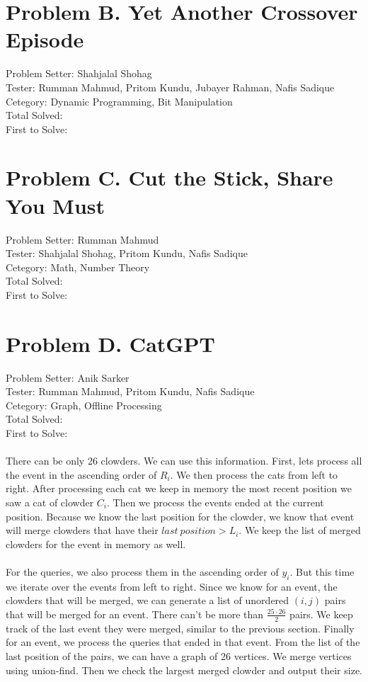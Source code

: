 \documentclass[11pt,a4paper]{article}
\begin{document}
\section*{Problem B. Yet Another Crossover Episode}
Problem Setter: Shahjalal Shohag \\
Tester: Rumman Mahmud, Pritom Kundu, Jubayer Rahman, Nafis Sadique \\
Cetegory: Dynamic Programming, Bit Manipulation \\
Total Solved:  \\
First to Solve: \\

\section*{Problem C. Cut the Stick, Share You Must}
Problem Setter: Rumman Mahmud \\
Tester: Shahjalal Shohag, Pritom Kundu, Nafis Sadique \\
Cetegory: Math, Number Theory \\
Total Solved:  \\
First to Solve: \\

\section*{Problem D. CatGPT}
Problem Setter: Anik Sarker \\
Tester: Rumman Mahmud, Pritom Kundu, Nafis Sadique \\
Cetegory: Graph, Offline Processing \\
Total Solved:  \\
First to Solve: \\
\\
There can be only 26 clowders. We can use this information. First, lets process
all the event in the ascending order of $R_i$. We then process the cats from left
to right. After processing each cat we keep in memory the most recent position we 
saw a cat of clowder $C_i$. Then we process the events ended at the current position.
Because we know the last position for the clowder, we know that event will merge
clowders that have their $last\ position > L_i$. We keep the list of merged clowders
for the event in memory as well.\\
\\
For the queries, we also process them in the ascending order of $y_i$. But this time we 
iterate over the events from left to right. Since we know for an event, the clowders that
will be merged, we can generate a list of unordered $(i,j)$ pairs that will be merged for
an event. There can't be more than $\frac{25 \cdot 26}{2}$ pairs. We keep track of the last event
they were merged, similar to the previous section. Finally for an event, we process the 
queries that ended in that event. From the list of the last position of the pairs, we
can have a graph of 26 vertices. We merge vertices using union-find. Then we check the largest
merged clowder and output their size.
\end{document}
